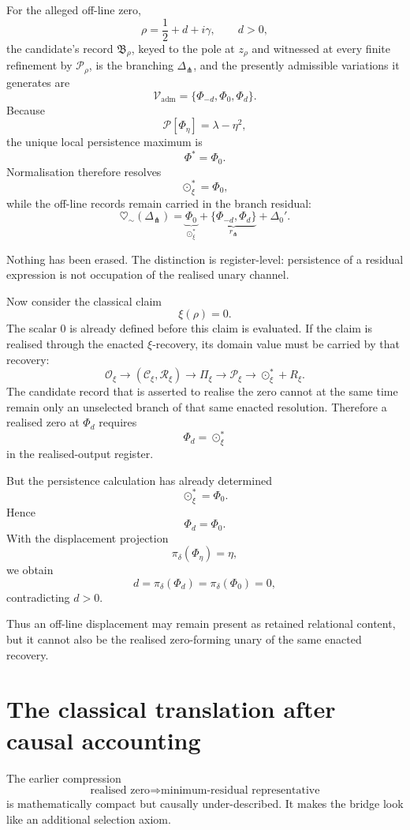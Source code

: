 \documentclass[11pt]{article}
\newcommand{\heartsim}{\heartsuit_{\sim}}
\newcommand{\Cctx}{\mathcal C}
\newcommand{\Rres}{\mathcal R}
\newcommand{\Pheart}{\mathcal P}
\newcommand{\DeltaFork}{\Delta_{\pitchfork}}
\begin{document}
For the alleged off-line zero,
\[
\rho=\frac12+d+i\gamma,
\qquad d>0,
\]
the candidate's record \(\mathfrak B_\rho\), keyed to the pole at \(z_\rho\) and witnessed at every finite refinement by \(\mathcal P_\rho\), is the branching \(\DeltaFork\), and the presently admissible variations it generates are
\[
\mathcal V_{\mathrm{adm}}
=
\{\Phi_{-d},\Phi_0,\Phi_d\}.
\]
Because
\[
\Pheart[\Phi_\eta]
=
\lambda-\eta^2,
\]
the unique local persistence maximum is
\[
\Phi^\ast=\Phi_0.
\]
Normalisation therefore resolves
\[
\odot_\xi^\ast=\Phi_0,
\]
while the off-line records remain carried in the branch residual:
\[
\heartsim(\DeltaFork)
=
\underbrace{\Phi_0}_{\odot_\xi^\ast}
+
\underbrace{\{\Phi_{-d},\Phi_d\}}_{r_{\pitchfork}}
+
\Delta_0'.
\]

Nothing has been erased. The distinction is register-level: persistence of a residual expression is not occupation of the realised unary channel.

Now consider the classical claim
\[
\xi(\rho)=0.
\]
The scalar \(0\) is already defined before this claim is evaluated. If the claim is realised through the enacted \(\xi\)-recovery, its domain value must be carried by that recovery:
\[
\mathcal O_\xi
\longrightarrow
(\Cctx_\xi,\Rres_\xi)
\longrightarrow
\Pi_\xi
\longrightarrow
\Pheart_\xi
\longrightarrow
\odot_\xi^\ast+R_\xi.
\]
The candidate record that is asserted to realise the zero cannot at the same time remain only an unselected branch of that same enacted resolution. Therefore a realised zero at \(\Phi_d\) requires
\[
\Phi_d=\odot_\xi^\ast
\]
in the realised-output register.

But the persistence calculation has already determined
\[
\odot_\xi^\ast=\Phi_0.
\]
Hence
\[
\Phi_d=\Phi_0.
\]
With the displacement projection
\[
\pi_\delta(\Phi_\eta)=\eta,
\]
we obtain
\[
d
=
\pi_\delta(\Phi_d)
=
\pi_\delta(\Phi_0)
=
0,
\]
contradicting \(d>0\).

Thus an off-line displacement may remain present as retained relational content, but it cannot also be the realised zero-forming unary of the same enacted recovery.

\section{The classical translation after causal accounting}

The earlier compression
\[
\text{realised zero}
\Longrightarrow
\text{minimum-residual representative}
\]
is mathematically compact but causally under-described. It makes the bridge look like an additional selection axiom.
\end{document}
